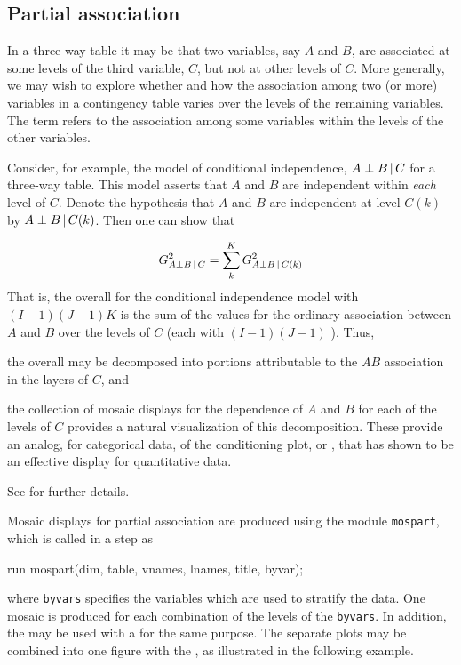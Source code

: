 \subsection{Partial association}\label{sec:mospart}

In a three-way table it may be that two variables, say $A$ and $B$, are
associated at some levels of the third variable, $C$, but not at other
levels of $C$. More generally, we may wish to explore whether and how the
association among two (or more) variables in a contingency table varies over
the levels of the remaining variables. The term  refers
to the association among some variables within the levels of the other
variables.

Consider, for example, the model of conditional independence, $A\perp B\, | \, C$
for a three-way table. This model asserts that $A$ and $B$ are independent
within \textit{each} level of $C$. Denote the hypothesis that $A$ and $B$
are independent at level $C(k)$ by $A\perp B\, | \, C(k)$. Then one can show
\citep{Andersen:91} that

\begin{equation}\label{eq:partial1}
G_{A\perp B\, | \, C}^2=\sum_k^K G_{A\perp B\, | \, C(k)}^2
\end{equation}
That is, the overall \GSQ{} for the conditional independence model
with $(I-1)(J-1)K$ \df{} is the
sum of the values for the ordinary association between $A$ and $B$ over the levels of 
$C$ (each with $(I-1)(J-1)$ \df{}).
Thus, 
\begin{seriate}
\item the overall \GSQ{} may be decomposed into portions attributable
to the $AB$ association in the layers of $C$, and
\item the collection of mosaic displays for the dependence of $A$ and $B$
for each of the levels of $C$ provides a natural visualization of this
decomposition.  These provide an analog, for categorical data, of the conditioning plot, or
, that
\citet{Cleveland:VisData} has shown to be an effective display for
quantitative data.
\end{seriate}
See \citet{Friendly:99b} for further details.

Mosaic displays for partial association are produced using the \IML{}
module \texttt{mospart}, which is called in a  step as
\begin{listing}
   run mospart(dim, table, vnames, lnames, title, byvar);
\end{listing}
where \texttt{byvars} specifies the variables which are used to
stratify the data.  One mosaic is produced for each combination
of the levels of the \texttt{byvars}.  In addition, the 
may be used with a  for the same purpose.
The separate plots may be combined into one figure with the ,
as illustrated in the following example.


